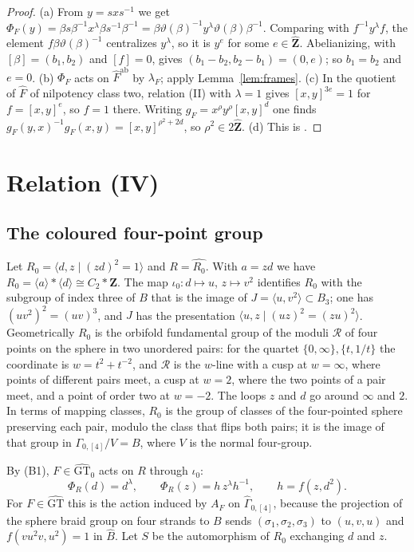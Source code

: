 \documentclass[11pt,a4paper]{article}
\theoremstyle{plain}
\theoremstyle{definition}
\theoremstyle{remark}
\newcommand{\GT}{\widehat{\mathrm{GT}}}
\newcommand{\GTz}{\widehat{\mathrm{GT}}_0}
\newcommand{\Zh}{\widehat{\mathbf Z}}
\newcommand{\Z}{\mathbf Z}
\newcommand{\Fh}{\widehat F}
\newcommand{\Bh}{\widehat B}
\newcommand{\Gh}{\widehat\Gamma}
\newcommand{\ab}{\mathrm{ab}}
\begin{document}
\begin{proof}
(a) From $y=sxs^{-1}$ we get
$\Phi_F(y)=\beta s\beta^{-1}x^\lambda\beta s^{-1}\beta^{-1}
=\beta\vartheta(\beta)^{-1}y^\lambda\vartheta(\beta)\beta^{-1}$. Comparing with $f^{-1}y^\lambda f$, the element
$f\beta\vartheta(\beta)^{-1}$ centralizes $y^\lambda$, so it is $y^e$ for some $e\in\Zh$. Abelianizing, with
$[\beta]=(b_1,b_2)$ and $[f]=0$, gives $(b_1-b_2,b_2-b_1)=(0,e)$; so $b_1=b_2$ and $e=0$.
(b) $\Phi_F$ acts on $\Fh^{\ab}$ by $\lambda_F$; apply Lemma~\ref{lem:frames}.
(c) In the quotient of $\Fh$ of nilpotency class two, relation (II) with $\lambda=1$ gives $[x,y]^{3e}=1$ for
$f=[x,y]^e$, so $f=1$ there. Writing $g_F=x^\rho y^\rho[x,y]^d$ one finds
$g_F(y,x)^{-1}g_F(x,y)=[x,y]^{\rho^2+2d}$, so $\rho^2\in2\Zh$.
(d) This is \cite[\S5, after Definition 5.1]{NS}.
\end{proof}

\section{Relation (IV)}\label{sec:IV}

\subsection*{The coloured four-point group}
Let $R_0=\langle d,z\mid(zd)^2=1\rangle$ and $R=\widehat{R_0}$. With $a=zd$ we have
$R_0=\langle a\rangle*\langle d\rangle\cong C_2*\Z$. The map $\iota_0:d\mapsto u$, $z\mapsto v^2$ identifies $R_0$
with the subgroup of index three of $B$ that is the image of $J=\langle u,v^2\rangle\subset B_3$; one has
$(uv^2)^2=(uv)^3$, and $J$ has the presentation $\langle u,z\mid(uz)^2=(zu)^2\rangle$. Geometrically $R_0$ is the
orbifold fundamental group of the moduli $\mathcal R$ of four points on the sphere in two unordered pairs: for
the quartet $\{0,\infty\},\{t,1/t\}$ the coordinate is $w=t^2+t^{-2}$, and $\mathcal R$ is the $w$-line with a cusp
at $w=\infty$, where points of different pairs meet, a cusp at $w=2$, where the two points of a pair meet, and a
point of order two at $w=-2$. The loops $z$ and $d$ go around $\infty$ and $2$. In terms of mapping classes, $R_0$
is the group of classes of the four-pointed sphere preserving each pair, modulo the class that flips both pairs;
it is the image of that group in $\Gamma_{0,[4]}/V=B$, where $V$ is the normal four-group.

By (B1), $F\in\GTz$ acts on $R$ through $\iota_0$:
\[
 \Phi_R(d)=d^\lambda,\qquad \Phi_R(z)=h\,z^\lambda h^{-1},\qquad h=f(z,d^2).
\]
For $F\in\GT$ this is the action induced by $A_F$ on $\Gh_{0,[4]}$, because the projection of the sphere braid
group on four strands to $B$ sends $(\sigma_1,\sigma_2,\sigma_3)$ to $(u,v,u)$ and $f(vu^2v,u^2)=1$ in $\Bh$. Let
$S$ be the automorphism of $R_0$ exchanging $d$ and $z$.
\end{document}
